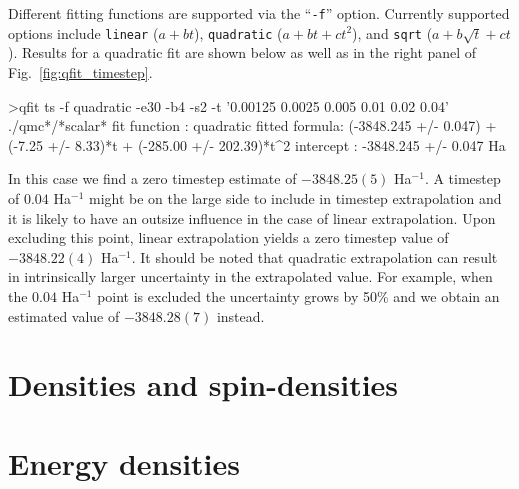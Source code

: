 Different fitting functions are supported via the ``\texttt{-f}'' option.
Currently supported options include \texttt{linear} ($a+bt$),
\texttt{quadratic} ($a+bt+ct^2$), and \texttt{sqrt} ($a+b\sqrt{t}+ct$).
Results for a quadratic fit are shown below as well as in the right
panel of Fig.~\ref{fig:qfit_timestep}.
\begin{shade}
>qfit ts -f quadratic -e30 -b4 -s2 -t '0.00125 0.0025 0.005 0.01 0.02 0.04' ./qmc*/*scalar*
fit function  : quadratic
fitted formula: (-3848.245 +/- 0.047) + (-7.25 +/- 8.33)*t + (-285.00 +/- 202.39)*t^2
intercept     : -3848.245 +/- 0.047  Ha
\end{shade}
In this case we find a zero timestep estimate of $-3848.25(5)$ Ha$^{-1}$.
A timestep of $0.04$ Ha$^{-1}$ might be on the large side to include in
timestep extrapolation and it is likely to have an outsize influence
in the case of linear extrapolation.  Upon excluding this point, linear
extrapolation yields a zero timestep value of $-3848.22(4)$ Ha$^{-1}$.
It should be noted that quadratic extrapolation can result in intrinsically
larger uncertainty in the extrapolated value.  For example, when the $0.04$
Ha$^{-1}$ point is excluded the uncertainty grows by 50\% and we obtain an
estimated value of $-3848.28(7)$ instead.



\section{Densities and spin-densities}
\label{sec:densities}

\section{Energy densities}
\label{sec:energydensities}




